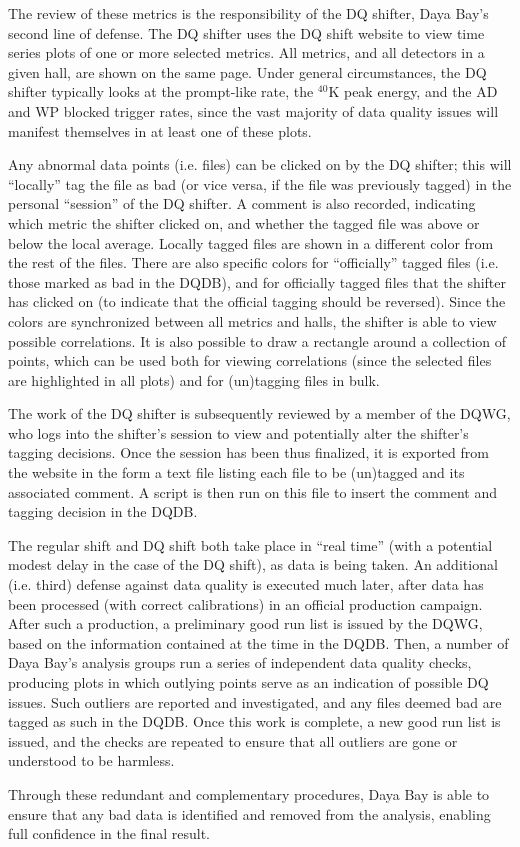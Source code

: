 \documentclass[../thesis.tex]{subfiles}
\begin{document}
The review of these metrics is the responsibility of the DQ shifter, Daya Bay's second line of defense. The DQ shifter uses the DQ shift website to view time series plots of one or more selected metrics. All metrics, and all detectors in a given hall, are shown on the same page. Under general circumstances, the DQ shifter typically looks at the prompt-like rate, the $^{40}$K peak energy, and the AD and WP blocked trigger rates, since the vast majority of data quality issues will manifest themselves in at least one of these plots.

Any abnormal data points (i.e. files) can be clicked on by the DQ shifter; this will ``locally'' tag the file as bad (or vice versa, if the file was previously tagged) in the personal ``session'' of the DQ shifter. A comment is also recorded, indicating which metric the shifter clicked on, and whether the tagged file was above or below the local average. Locally tagged files are shown in a different color from the rest of the files. There are also specific colors for ``officially'' tagged files (i.e. those marked as bad in the DQDB), and for officially tagged files that the shifter has clicked on (to indicate that the official tagging should be reversed). Since the colors are synchronized between all metrics and halls, the shifter is able to view possible correlations. It is also possible to draw a rectangle around a collection of points, which can be used both for viewing correlations (since the selected files are highlighted in all plots) and for (un)tagging files in bulk. 

The work of the DQ shifter is subsequently reviewed by a member of the DQWG, who logs into the shifter's session to view and potentially alter the shifter's tagging decisions. Once the session has been thus finalized, it is exported from the website in the form a text file listing each file to be (un)tagged and its associated comment. A script is then run on this file to insert the comment and tagging decision in the DQDB.

The regular shift and DQ shift both take place in ``real time'' (with a potential modest delay in the case of the DQ shift), as data is being taken. An additional (i.e. third) defense against data quality is executed much later, after data has been processed (with correct calibrations) in an official production campaign. After such a production, a preliminary good run list is issued by the DQWG, based on the information contained at the time in the DQDB. Then, a number of Daya Bay's analysis groups run a series of independent data quality checks, producing plots in which outlying points serve as an indication of possible DQ issues. Such outliers are reported and investigated, and any files deemed bad are tagged as such in the DQDB. Once this work is complete, a new good run list is issued, and the checks are repeated to ensure that all outliers are gone or understood to be harmless.

Through these redundant and complementary procedures, Daya Bay is able to ensure that any bad data is identified and removed from the analysis, enabling full confidence in the final result.
\end{document}
